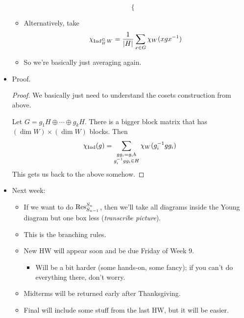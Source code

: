 \documentclass[../notes.tex]{subfiles}
\begin{document}
\begin{itemize}
\begin{itemize}
\begin{equation*}
\begin{cases}
            \end{cases}
        \end{equation*}
        \item Alternatively, take
        \begin{equation*}
            \chi_{\operatorname{Ind}_H^GW} = \frac{1}{|H|}\sum_{x\in G}\chi_W(xgx^{-1})
        \end{equation*}
        \item So we're basically just averaging again.
    \end{itemize}
    \item Proof.
    \begin{proof}
        We basically just need to understand the cosets construction from above.
        
        Let $G=g_1H\oplus\cdots\oplus g_kH$. There is a bigger block matrix that has $(\dim W)\times(\dim W)$ blocks. Then
        \begin{equation*}
            \chi_{\operatorname{Ind}}(g) = \sum_{\substack{gg_i=g_ih\\g_i^{-1}gg_i\in H}}\chi_W(g_i^{-1}gg_i)
        \end{equation*}
        This gets us back to the above somehow.
    \end{proof}
    \item Next week:
    \begin{itemize}
        \item If we want to do $\operatorname{Res}_{S_{n-1}}^{S_n}$, then we'll take all diagrams inside the Young diagram but one box less (\emph{transcribe picture}).
        \item This is the branching rules.
        \item New HW will appear soon and be due Friday of Week 9.
        \begin{itemize}
            \item Will be a bit harder (some hands-on, some fancy); if you can't do everything there, don't worry.
        \end{itemize}
        \item Midterms will be returned early after Thanksgiving.
        \item Final will include some stuff from the last HW, but it will be easier.
    \end{itemize}
\end{itemize}



\end{document}
